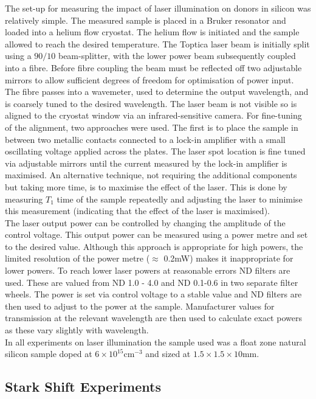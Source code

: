 The set-up for measuring the impact of laser illumination on donors in silicon was relatively simple.
The measured sample is placed in a Bruker resonator and loaded into a helium flow cryostat.
The helium flow is initiated and the sample allowed to reach the desired temperature.
The Toptica laser beam is initially split using a $90/10$ beam-splitter, with the lower power beam subsequently coupled into a fibre.
Before fibre coupling the beam must be reflected off two adjustable mirrors to allow sufficient degrees of freedom for optimisation of power input.
The fibre passes into a wavemeter, used to determine the output wavelength, and is coarsely tuned to the desired wavelength.
The laser beam is not visible so is aligned to the cryostat window via an infrared-sensitive camera.
For fine-tuning of the alignment, two approaches were used.
The first is to place the sample in between two metallic contacts connected to a lock-in amplifier with a small oscillating voltage applied across the plates.
The laser spot location is fine tuned via adjustable mirrors until the current measured by the lock-in amplifier is maximised.
An alternative technique, not requiring the additional components but taking more time, is to maximise the effect of the laser.
This is done by measuring $T_1$ time of the sample repeatedly and adjusting the laser to minimise this measurement (indicating that the effect of the laser is maximised).
\\
The laser output power can be controlled by changing the amplitude of the control voltage.
This output power can be measured using a power metre and set to the desired value.
Although this approach is appropriate for high powers, the limited resolution of the power metre ($\approx$ 0.2mW) makes it inappropriate for lower powers.
To reach lower laser powers at reasonable errors ND filters are used.
These are valued from ND 1.0 - 4.0 and ND 0.1-0.6 in two separate filter wheels.
The power is set via control voltage to a stable value and ND filters are then used to adjust to the power at the sample.
Manufacturer values for transmission at the relevant wavelength are then used to calculate exact powers as these vary slightly with wavelength.
\\
In all experiments on laser illumination the sample used was a float zone natural silicon sample doped at $6\times10^{15}\text{cm}^{-3}$ and sized at $1.5\times1.5\times10$mm.

\subsection{Stark Shift Experiments}

